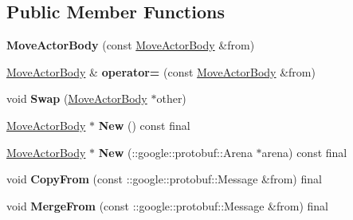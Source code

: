 \subsection*{Public Member Functions}
\begin{DoxyCompactItemize}
\item 
\mbox{\label{classtbBasics_1_1MoveActorBody_ae538138c4892cef567e0e22183bc31a2}} 
{\bfseries Move\+Actor\+Body} (const \hyperlink{classtbBasics_1_1MoveActorBody}{Move\+Actor\+Body} \&from)
\item 
\mbox{\label{classtbBasics_1_1MoveActorBody_a34581da31521b5fe1c42af4b4d80502d}} 
\hyperlink{classtbBasics_1_1MoveActorBody}{Move\+Actor\+Body} \& {\bfseries operator=} (const \hyperlink{classtbBasics_1_1MoveActorBody}{Move\+Actor\+Body} \&from)
\item 
\mbox{\label{classtbBasics_1_1MoveActorBody_afd05dd63bdba95c2eaa4faeb6577c995}} 
void {\bfseries Swap} (\hyperlink{classtbBasics_1_1MoveActorBody}{Move\+Actor\+Body} $\ast$other)
\item 
\mbox{\label{classtbBasics_1_1MoveActorBody_a5eef5652b5e48dfcce0a02978e0a7e75}} 
\hyperlink{classtbBasics_1_1MoveActorBody}{Move\+Actor\+Body} $\ast$ {\bfseries New} () const final
\item 
\mbox{\label{classtbBasics_1_1MoveActorBody_a38b6eeed064f16308ed327f7e6e354db}} 
\hyperlink{classtbBasics_1_1MoveActorBody}{Move\+Actor\+Body} $\ast$ {\bfseries New} (\+::google\+::protobuf\+::\+Arena $\ast$arena) const final
\item 
\mbox{\label{classtbBasics_1_1MoveActorBody_a944d7adb2e003233f75475b974af853d}} 
void {\bfseries Copy\+From} (const \+::google\+::protobuf\+::\+Message \&from) final
\item 
\mbox{\label{classtbBasics_1_1MoveActorBody_accb066e88309037adc07839fc9fdf289}} 
void {\bfseries Merge\+From} (const \+::google\+::protobuf\+::\+Message \&from) final
\item 
\mbox{\label{classtbBasics_1_1MoveActorBody_a737af6ffb6dd1cf9a640cbe0ee3852e5}} 

\end{DoxyCompactItemize}
